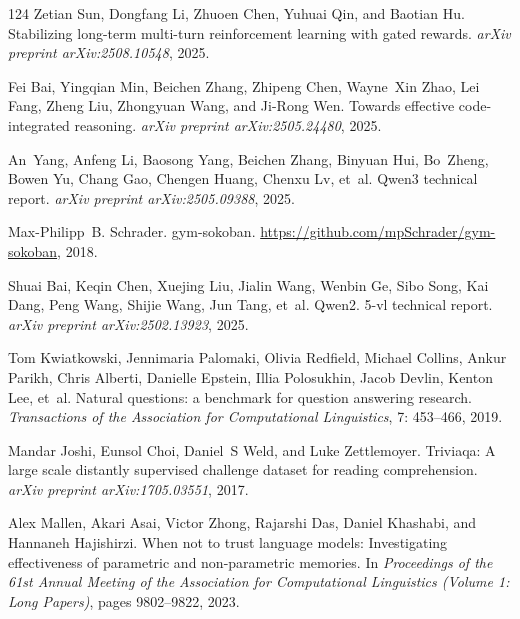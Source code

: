 \documentclass[]{youtu} %
\begin{document}
\begin{thebibliography}{124}
Zetian Sun, Dongfang Li, Zhuoen Chen, Yuhuai Qin, and Baotian Hu.
\newblock Stabilizing long-term multi-turn reinforcement learning with gated rewards.
\newblock \emph{arXiv preprint arXiv:2508.10548}, 2025.

Fei Bai, Yingqian Min, Beichen Zhang, Zhipeng Chen, Wayne~Xin Zhao, Lei Fang, Zheng Liu, Zhongyuan Wang, and Ji-Rong Wen.
\newblock Towards effective code-integrated reasoning.
\newblock \emph{arXiv preprint arXiv:2505.24480}, 2025{}.

An~Yang, Anfeng Li, Baosong Yang, Beichen Zhang, Binyuan Hui, Bo~Zheng, Bowen Yu, Chang Gao, Chengen Huang, Chenxu Lv, et~al.
\newblock Qwen3 technical report.
\newblock \emph{arXiv preprint arXiv:2505.09388}, 2025.

Max-Philipp~B. Schrader.
\newblock gym-sokoban.
\newblock \url{https://github.com/mpSchrader/gym-sokoban}, 2018.

Shuai Bai, Keqin Chen, Xuejing Liu, Jialin Wang, Wenbin Ge, Sibo Song, Kai Dang, Peng Wang, Shijie Wang, Jun Tang, et~al.
\newblock Qwen2. 5-vl technical report.
\newblock \emph{arXiv preprint arXiv:2502.13923}, 2025{}.

Tom Kwiatkowski, Jennimaria Palomaki, Olivia Redfield, Michael Collins, Ankur Parikh, Chris Alberti, Danielle Epstein, Illia Polosukhin, Jacob Devlin, Kenton Lee, et~al.
\newblock Natural questions: a benchmark for question answering research.
\newblock \emph{Transactions of the Association for Computational Linguistics}, 7: 453--466, 2019.

Mandar Joshi, Eunsol Choi, Daniel~S Weld, and Luke Zettlemoyer.
\newblock Triviaqa: A large scale distantly supervised challenge dataset for reading comprehension.
\newblock \emph{arXiv preprint arXiv:1705.03551}, 2017.

Alex Mallen, Akari Asai, Victor Zhong, Rajarshi Das, Daniel Khashabi, and Hannaneh Hajishirzi.
\newblock When not to trust language models: Investigating effectiveness of parametric and non-parametric memories.
\newblock In \emph{Proceedings of the 61st Annual Meeting of the Association for Computational Linguistics (Volume 1: Long Papers)}, pages 9802--9822, 2023.


\end{thebibliography}
\end{document}
